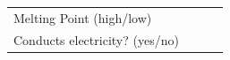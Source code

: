 \begin{enumerate}[noitemsep, label=\textbf{\arabic*}. ]
{{\begin{center}
\begin{tabular}[t]{|l|l|l|l|}
    
     \tabularnewline\cline{1-1}\cline{2-2}\cline{3-3}\cline{4-4}
    
    
        Melting Point (high/low) &
    
    
         &
    
    
         &
    
    
     \tabularnewline\cline{1-1}\cline{2-2}\cline{3-3}\cline{4-4}
    
    
        Conducts electricity? (yes/no) &
    
    
         &
    
    
         &
    

\end{tabular}
\end{center}}}
\end{enumerate}
